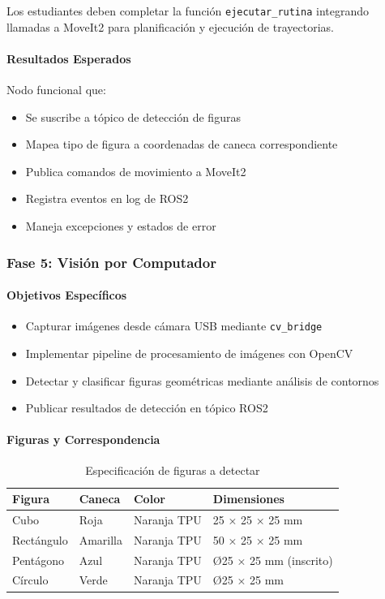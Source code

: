 Los estudiantes deben completar la función \texttt{ejecutar\_rutina} integrando llamadas a MoveIt2 para planificación y ejecución de trayectorias.

\paragraph{Resultados Esperados}

Nodo funcional que:
\begin{itemize}
    \item Se suscribe a tópico de detección de figuras
    \item Mapea tipo de figura a coordenadas de caneca correspondiente
    \item Publica comandos de movimiento a MoveIt2
    \item Registra eventos en log de ROS2
    \item Maneja excepciones y estados de error
\end{itemize}

\subsubsection{Fase 5: Visión por Computador}

\paragraph{Objetivos Específicos}
\begin{itemize}
    \item Capturar imágenes desde cámara USB mediante \texttt{cv\_bridge}
    \item Implementar pipeline de procesamiento de imágenes con OpenCV
    \item Detectar y clasificar figuras geométricas mediante análisis de contornos
    \item Publicar resultados de detección en tópico ROS2
\end{itemize}

\paragraph{Figuras y Correspondencia}

\begin{table}[H]
\centering
\caption{Especificación de figuras a detectar}
\label{tab:figuras}
\small
\begin{tabular}{|l|l|l|l|}
\hline
\textbf{Figura} & \textbf{Caneca} & \textbf{Color} & \textbf{Dimensiones} \\
\hline
Cubo & Roja & Naranja TPU & 25 × 25 × 25 mm \\
Rectángulo & Amarilla & Naranja TPU & 50 × 25 × 25 mm \\
Pentágono & Azul & Naranja TPU & Ø25 × 25 mm (inscrito) \\
Círculo & Verde & Naranja TPU & Ø25 × 25 mm \\
\hline
\end{tabular}
\end{table}

